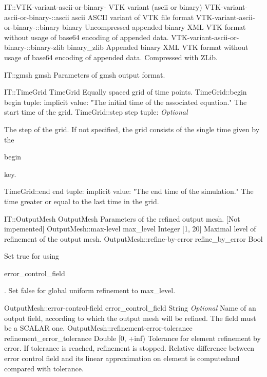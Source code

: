 \begin{SelectionType}
	{IT::VTK-variant-ascii-or-binary-}
	{VTK variant (ascii or binary)}
	{}
		\SelectionItem
			{VTK-variant-ascii-or-binary-::ascii}
			{ascii}
			{{{ASCII variant of VTK file format}%
}}
		\SelectionItem
			{VTK-variant-ascii-or-binary-::binary}
			{binary}
			{{{Uncompressed appended binary XML VTK format without usage of base64 encoding of appended data.}%
}}
		\SelectionItem
			{VTK-variant-ascii-or-binary-::binary-zlib}
			{binary{\_}zlib}
			{{{Appended binary XML VTK format without usage of base64 encoding of appended data.
Compressed with ZLib.}%
}}
\end{SelectionType}
\begin{RecordType}
	{IT::gmsh}
	{gmsh}
	{}%
	{}%
	{{{Parameters of gmsh output format.}%
}}
\end{RecordType}
\begin{RecordType}
	{IT::TimeGrid}
	{TimeGrid}
	{}%
	{}%
	{{{Equally spaced grid of time points.}%
}}
		\RecKey
			{TimeGrid::begin}
			{begin}
			{{tuple: }}{}
			{implicit value: "{The initial time of the associated equation.}"}
			{{{The start time of the grid.}%
}}
		\RecKey
			{TimeGrid::step}
			{step}
			{{tuple: }}{}
			{ \it{Optional}}
			{{{The step of the grid.
If not specified, the grid consists of the single time given by the }\begin{ttfamily}begin\end{ttfamily}{ key.}%
}}
		\RecKey
			{TimeGrid::end}
			{end}
			{{tuple: }}{}
			{implicit value: "{The end time of the simulation.}"}
			{{{The time greater or equal to the last time in the grid.}%
}}
\end{RecordType}
\begin{RecordType}
	{IT::OutputMesh}
	{OutputMesh}
	{}%
	{}%
	{{{Parameters of the refined output mesh. [Not impemented]}%
}}
		\RecKey
			{OutputMesh::max-level}
			{max{\_}level}
			{{Integer [1, 20]}}{}
			{ }
			{{{Maximal level of refinement of the output mesh.}%
}}
		\RecKey
			{OutputMesh::refine-by-error}
			{refine{\_}by{\_}error}
			{{Bool}}{}
			{ }
			{{{Set true for using }\begin{ttfamily}error{\_}control{\_}field\end{ttfamily}{. Set false for global uniform refinement to max{\_}level.}%
}}
		\RecKey
			{OutputMesh::error-control-field}
			{error{\_}control{\_}field}
			{{String}}{}
			{ \it{Optional}}
			{{{Name of an output field, according to which the output mesh will be refined.
The field must be a SCALAR one.}%
}}
		\RecKey
			{OutputMesh::refinement-error-tolerance}
			{refinement{\_}error{\_}tolerance}
			{{Double [0, +inf)}}{}
			{ }
			{{{Tolerance for element refinement by error.
If tolerance is reached, refinement is stopped.
Relative difference between error control field and its linear approximation on element is computedand compared with tolerance.}%
}}
\end{RecordType}

